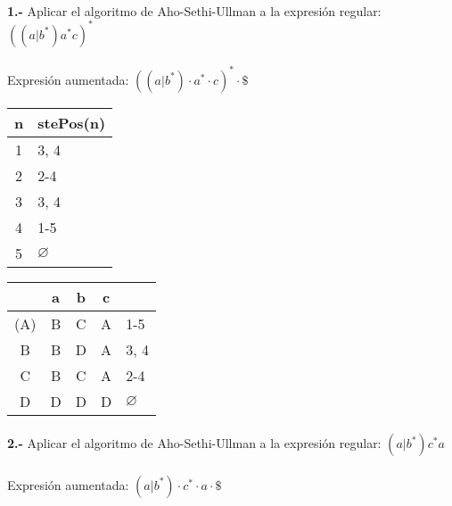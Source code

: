 \documentclass[11pt,a4paper]{report}
\begin{document}
\paragraph{}

\paragraph{}
\textbf{1.-} Aplicar el algoritmo de Aho-Sethi-Ullman a la expresión regular: \textbf{$ ((a|b^*)a^*c)^* $} \\
\\
Expresión aumentada: $ ((a|b^*)\cdot a^*\cdot c)^*\cdot \$  $ \\

\begin{tabular} {| c | l |}
\hline
n & stePos(n) \\ \hline
1 & 3, 4 \\ \hline
2 & 2-4 \\ \hline
3 & 3, 4 \\ \hline
4 & 1-5 \\ \hline
5 & $\varnothing$ \\ \hline
\end{tabular}
\quad
\begin{tabular} {| c | c |c |c | l |}
\hline 
& a & b & c & \\ \hline
(A) & B & C & A & 1-5\\ \hline
B & B & D & A & 3, 4\\ \hline
C & B & C & A & 2-4\\ \hline
D & D & D & D & $\varnothing$\\ \hline
\end{tabular}\paragraph{}
\textbf{2.-} Aplicar el algoritmo de Aho-Sethi-Ullman a la expresión regular: \textbf{$ (a|b^*)c^*a $} \\
\\
Expresión aumentada: $ (a|b^*)\cdot c^*\cdot a\cdot \$  $ \\
\end{document}
